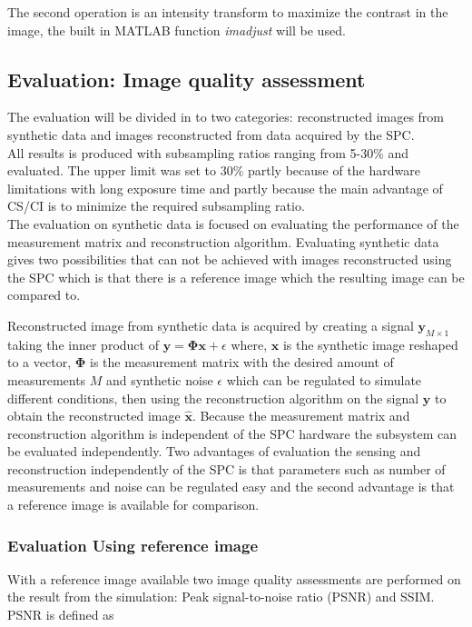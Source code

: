 The second operation is an intensity transform to maximize the contrast in the image, the built in MATLAB function \textit{imadjust} will be used.   


\subsection{Evaluation: Image quality assessment}
\label{sec:method_eval}
The evaluation will be divided in to two categories: reconstructed images from synthetic data and images reconstructed from data acquired by the SPC.\\[0.1in] 

All results is produced with subsampling ratios ranging from 5-30\% and evaluated. The upper limit was set to 30\% partly because of the hardware limitations with long exposure time and partly because the main advantage of CS/CI is to minimize the required subsampling ratio.\\[0.1in]

The evaluation on synthetic data is focused on evaluating the performance of the measurement matrix and reconstruction algorithm. Evaluating synthetic data gives two possibilities that can not be achieved with images reconstructed using the SPC which is that there is a reference image which the resulting image can be compared to.

Reconstructed image from synthetic data is acquired by creating a signal $ \mathbf{ y }_{M\times1}$ taking the inner product of $ \mathbf{y} = \mathbf{\Phi} \mathbf{x} + \epsilon$ where, $\mathbf{x}$ is the synthetic image reshaped to a vector, $\mathbf{\Phi}$ is the measurement matrix with the desired amount of measurements $M$ and synthetic noise $\epsilon$ which can be regulated to simulate different conditions, then using the reconstruction algorithm on the signal $\mathbf{y}$ to obtain the reconstructed image $\mathbf{\hat x}$. Because the measurement matrix and reconstruction algorithm is independent of the SPC hardware the subsystem can be evaluated independently. Two advantages of evaluation the sensing and reconstruction independently of the SPC is that parameters such as number of measurements and noise can be regulated easy and the second advantage is that a reference image is available for comparison.\\[0.1in] 

\subsubsection{Evaluation Using reference image}
With a reference image available two image quality assessments are performed on the result from the simulation: Peak signal-to-noise ratio (PSNR) and  SSIM. PSNR is defined as

